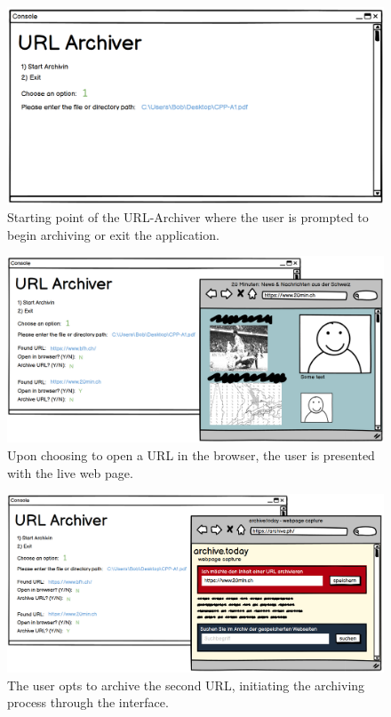 \begin{figure}[h!]
    \centering
    \includegraphics[width=1\textwidth]{pictures/UX-Prototype/Prototype_1}
    \caption{Starting point of the URL-Archiver where the user is prompted to begin archiving or exit the application.}
    \label{fig:Initial_Interface}
\end{figure}
\begin{figure}[h!]
    \centering
    \includegraphics[width=1\textwidth]{pictures/UX-Prototype/Prototype_2}
    \caption{Upon choosing to open a URL in the browser, the user is presented with the live web page.}
    \label{fig:URL_Discovery}
\end{figure}
\begin{figure}[h!]
    \centering
    \includegraphics[width=1\textwidth]{pictures/UX-Prototype/Prototype_3}
    \caption{The user opts to archive the second URL, initiating the archiving process through the interface.}
    \label{fig:Browser_Interaction}
\end{figure}
\clearpage

